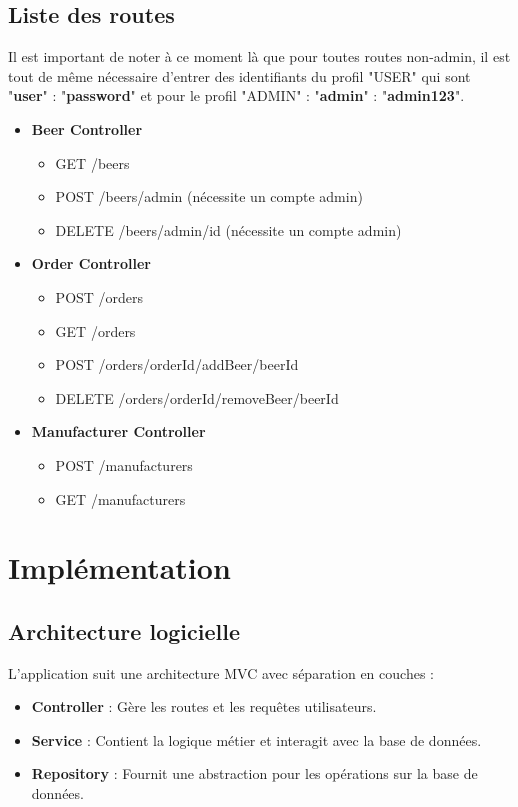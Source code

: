 \documentclass{article}
\begin{document}
\subsection{Liste des routes}
Il est important de noter à ce moment là que pour toutes routes non-admin, il est tout de même nécessaire d'entrer des identifiants du profil "USER" qui sont 
"\textbf{user}" : "\textbf{password}"
et pour le profil "ADMIN" :  "\textbf{admin}" : "\textbf{admin123}".
\begin{itemize}
    \item \textbf{Beer Controller}
        \begin{itemize}
            \item GET /beers
            \item POST /beers/admin (nécessite un compte admin)
            \item DELETE /beers/admin/{id} (nécessite un compte admin)
        \end{itemize}
    \item \textbf{Order Controller}
        \begin{itemize}
            \item POST /orders
            \item GET /orders
            \item POST /orders/{orderId}/addBeer/{beerId}
            \item DELETE /orders/{orderId}/removeBeer/{beerId}
        \end{itemize}
    \item \textbf{Manufacturer Controller}
        \begin{itemize}
            \item POST /manufacturers
            \item GET /manufacturers
        \end{itemize}
\end{itemize}

\section{Implémentation}

\subsection{Architecture logicielle}
L'application suit une architecture MVC avec séparation en couches :
\begin{itemize}
    \item \textbf{Controller} : Gère les routes et les requêtes utilisateurs.
    \item \textbf{Service} : Contient la logique métier et interagit avec la base de données.
    \item \textbf{Repository} : Fournit une abstraction pour les opérations sur la base de données.
\end{itemize}
\end{document}
